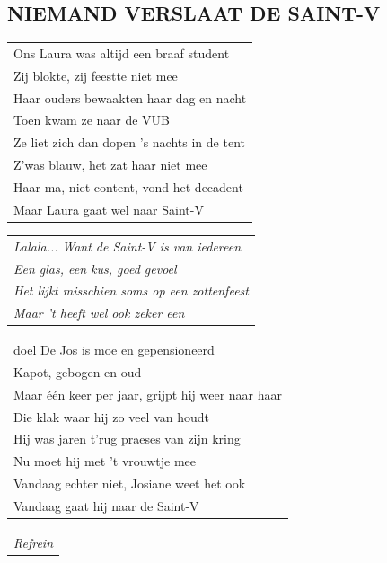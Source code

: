 \documentclass{article}
\begin{document}
\subsection*{NIEMAND VERSLAAT DE SAINT-V}
\begin{flushleft}
\begin{tabularx}{0.8\textwidth} {
   >{\raggedright\arraybackslash}X}
   Ons Laura was altijd een braaf student\\
Zij blokte, zij feestte niet mee\\
Haar ouders bewaakten haar dag en nacht\\
Toen kwam ze naar de VUB\\
Ze liet zich dan dopen ’s nachts in de tent\\
Z’was blauw, het zat haar niet mee\\
Haar ma, niet content, vond het decadent\\
Maar Laura gaat wel naar Saint-V\\
\end{tabularx}
\end{flushleft}\begin{flushleft}
\begin{tabularx}{0.8\textwidth} {
   >{\raggedright\arraybackslash}X}
   \textit{Lalala...}
\textit{Want de Saint-V is van iedereen}\\
\textit{Een glas, een kus, goed gevoel}\\
\textit{Het lijkt misschien soms op een zottenfeest}\\
\textit{Maar ’t heeft wel ook zeker een}\\
\end{tabularx}
\end{flushleft}\begin{flushleft}
\begin{tabularx}{0.8\textwidth} {
   >{\raggedright\arraybackslash}X}doel
De Jos is moe en gepensioneerd\\
Kapot, gebogen en oud\\
Maar één keer per jaar, grijpt hij weer naar haar\\
Die klak waar hij zo veel van houdt\\
Hij was jaren t’rug praeses van zijn kring\\
Nu moet hij met ’t vrouwtje mee\\
Vandaag echter niet, Josiane weet het ook\\
Vandaag gaat hij naar de Saint-V\\
\end{tabularx}
\end{flushleft}\begin{flushleft}
\begin{tabularx}{0.8\textwidth} {
   >{\raggedright\arraybackslash}X}
\textit{Refrein}
\end{tabularx}
\end{flushleft}
\end{document}
